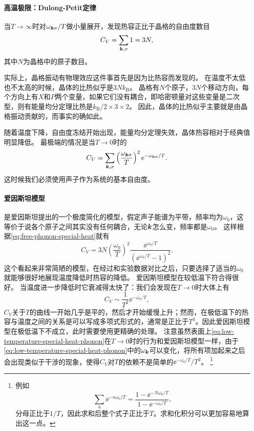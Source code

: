 \paragraph{高温极限：Dulong-Petit定律} 当$T \to \infty$时对$\omega_{\vb*{k} \sigma} / T$做小量展开，发现热容正比于晶格的自由度数目
\begin{equation}
    C_V = \sum_{\vb*{k}, \sigma} 1 = 3 N ,
\end{equation}
其中$N$为晶格中的原子数目。

实际上，晶格振动有物理效应这件事首先是因为比热容而发现的。
在温度不太低也不太高的时候，晶体的比热似乎是$3 N k_\text{B}$。
晶格有$N$个原子，$3N$个移动方向，每个方向上有$X$和$P$两个变量，如果它们没有耦合，即哈密顿量对这些变量是二次型，则有能量均分定理比热是$k_\text{B}/2 \times 3 \times 2$。
因此，晶体的比热似乎主要就是由晶格振动贡献的，而事实的确如此。

随着温度下降，自由度冻结开始出现，能量均分定理失效，晶体热容相对于经典值明显降低。
最极端的情况是当$T \to 0$时的
\begin{equation}
    C_V = \sum_{\vb*{k}, \sigma} \left(\frac{\omega_{\vb*{k}\sigma}}{T}\right)^2 \mathrm{e}^{-\omega_{\vb*{k}\sigma} / T}.
    \label{eq:low-temperature-special-heat-phonon}
\end{equation}
这时候我们必须使用声子作为系统的基本自由度。

\paragraph{爱因斯坦模型} 是爱因斯坦提出的一个极度简化的模型，假定声子能谱为平带，频率均为$\omega_0$，这等价于说各个原子之间其实没有任何耦合，无论$\vb*{k}$怎么变，频率都是$\omega_0$。
这样根据\eqref{eq:free-phonon-special-heat}就有
\begin{equation}
    C_V = 3 N \left(\frac{\omega_0}{T}\right)^2 \frac{\ee^{\omega_0 / T}}{(\ee^{\omega_0 / T} - 1)^2}.
\end{equation}
这个看起来非常简陋的模型，在经过和实验数据对比之后，只要选择了适当的$\omega_0$就能够很好地展现温度降低时热容的降低。
爱因斯坦模型在较低温下符合得很好。
当温度进一步降低时它衰减得太快了：我们会发现在$T \to 0$时大体上有
\[
    C_V \sim \frac{1}{T^2} \ee^{- \omega_0 / T},
\]
$C_V$关于$T$的曲线一开始几乎是平的，然后才开始缓慢上升；然而，在极低温下的热容与温度之间的关系是可以写成多项式形式的，通常是正比于$T^3$。因此爱因斯坦模型在极低温下不成立，此时需要使用更精确的处理。
注意虽然表面上\eqref{eq:low-temperature-special-heat-phonon}在$T \to 0$时的行为和爱因斯坦模型一样，由于\eqref{eq:low-temperature-special-heat-phonon}中的$\omega_{\vb*{k}}$可以变化，将所有项加起来之后会出现类似于干涉的现象，使得$C_V$对$T$的依赖不是简单的$\ee^{- \omega_0 / T} / T^2$。%
\footnote{
    例如
    \[
        \sum_n \ee^{- n \omega_0 / T} = \frac{1 - \ee^{- N \omega_0 / T}}{1 - \ee^{- \omega_0 / T}},
    \]
    分母正比于$1/T$，因此求和后整个式子正比于$T$。求和化积分可以更加容易地算出这一点。
}%

